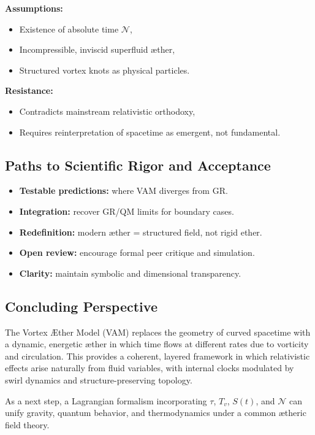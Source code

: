 \documentclass[preprint]{revtex4-2}
\begin{document}
\textbf{Assumptions:}
\begin{itemize}
    \item Existence of absolute time \( \mathcal{N} \),
    \item Incompressible, inviscid superfluid æther,
    \item Structured vortex knots as physical particles.
\end{itemize}

\textbf{Resistance:}
\begin{itemize}
    \item Contradicts mainstream relativistic orthodoxy,
    \item Requires reinterpretation of spacetime as emergent, not fundamental.
\end{itemize}

\subsection{Paths to Scientific Rigor and Acceptance}

\begin{itemize}
    \item \textbf{Testable predictions:} where VAM diverges from GR.
    \item \textbf{Integration:} recover GR/QM limits for boundary cases.
    \item \textbf{Redefinition:} modern æther = structured field, not rigid ether.
    \item \textbf{Open review:} encourage formal peer critique and simulation.
    \item \textbf{Clarity:} maintain symbolic and dimensional transparency.
\end{itemize}

\subsection{Concluding Perspective}

The Vortex Æther Model (VAM) replaces the geometry of curved spacetime with a dynamic, energetic æther in which time flows at different rates due to vorticity and circulation. This provides a coherent, layered framework in which relativistic effects arise naturally from fluid variables, with internal clocks modulated by swirl dynamics and structure-preserving topology.

As a next step, a Lagrangian formalism incorporating \( \tau \), \( T_v \), \( S(t) \), and \( \mathcal{N} \) can unify gravity, quantum behavior, and thermodynamics under a common ætheric field theory.
\end{document}

